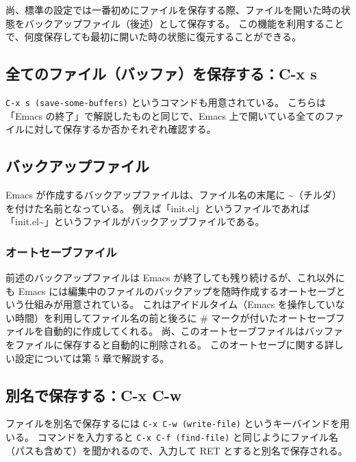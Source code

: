 尚、標準の設定では一番初めにファイルを保存する際、ファイルを開いた時の状態をバックアップファイル（後述）として保存する。
この機能を利用することで、何度保存しても最初に開いた時の状態に復元することができる。
\subsection{全てのファイル（バッファ）を保存する：C-x s}
\texttt{C-x s (save-some-buffers)} というコマンドも用意されている。
こちらは「Emacs の終了」で解説したものと同じで、Emacs 上で開いている全てのファイルに対して保存するか否かそれぞれ確認する。
\subsection{バックアップファイル}
Emacs が作成するバックアップファイルは、ファイル名の末尾に \textasciitilde（チルダ）を付けた名前となっている。
例えば「init.el」というファイルであれば「init.el\textasciitilde」というファイルがバックアップファイルである。
\subsubsection{オートセーブファイル}
前述のバックアップファイルは Emacs が終了しても残り続けるが、これ以外にも Emacs には編集中のファイルのバックアップを随時作成するオートセーブという仕組みが用意されている。
これはアイドルタイム（Emacs を操作していない時間）を利用してファイル名の前と後ろに \# マークが付いたオートセーブファイルを自動的に作成してくれる。
尚、このオートセーブファイルはバッファをファイルに保存すると自動的に削除される。
このオートセーブに関する詳しい設定については第 5 章で解説する。
\subsection{別名で保存する：C-x C-w}
ファイルを別名で保存するには \texttt{C-x C-w (write-file)} というキーバインドを用いる。
コマンドを入力すると \texttt{C-x C-f (find-file)} と同じようにファイル名（パスも含めて）を聞かれるので、入力して RET とすると別名で保存される。
